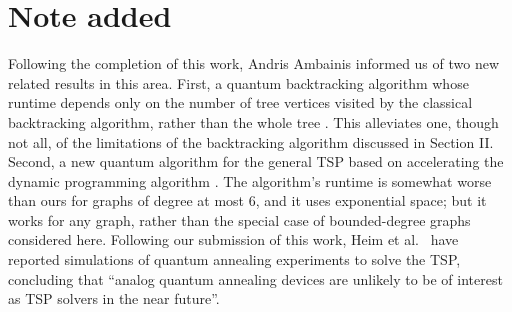 \section{Note added}

Following the completion of this work, Andris Ambainis informed us of two new related results in this area. First, a quantum backtracking algorithm whose runtime depends only on the number of tree vertices visited by the classical backtracking algorithm, rather than the whole tree \cite{ambainis2017}. This alleviates one, though not all, of the limitations of the backtracking algorithm discussed in Section II. Second, a new quantum algorithm for the general TSP based on accelerating the dynamic programming algorithm \cite{ambainis2016b}. The algorithm's runtime is somewhat worse than ours for graphs of degree at most 6, and it uses exponential space; but it works for any graph, rather than the special case of bounded-degree graphs considered here. Following our submission of this work, Heim et al.~\cite{heim2017} have reported simulations of quantum annealing experiments to solve the TSP, concluding that ``analog quantum annealing devices are unlikely to be of interest as TSP solvers in the near future''.
